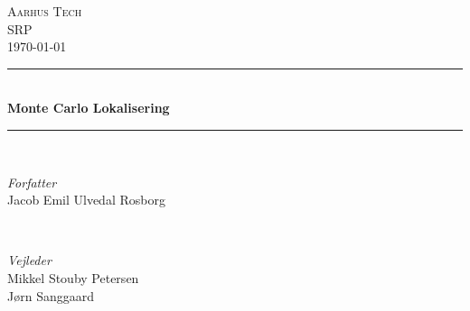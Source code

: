 \documentclass[../SRP.tex]{subfiles}
\begin{document}
\begin{titlepage}
  \newcommand{\HRule}{\rule{\linewidth}{0.5mm}}

	\center

	\textsc{\LARGE Aarhus Tech} \\[0.25cm]
  \textsc{\Large SRP} \\[0.5cm]



  {\large\today}
  \\[1cm]

	\HRule\\[0.4cm]
	{\huge\bfseries Monte Carlo Lokalisering}\\[0.1cm]

	\HRule\\[1.5cm]

	\begin{minipage}{0.4\textwidth}
		\begin{flushleft}
			\large
			\textit{Forfatter}\\
			Jacob Emil Ulvedal Rosborg %
		\end{flushleft}
	\end{minipage}
	~
	\begin{minipage}{0.4\textwidth}
		\begin{flushright}
			\large
			\textit{Vejleder}\\
			Mikkel Stouby Petersen\\
			Jørn Sanggaard
		\end{flushright}
	\end{minipage}\\[4.0cm]

  \begin{center}
  \begin{minipage}{0.8\textwidth}
    \\
    \justify
    \lipsum[1]
  \end{minipage}
  \end{center}
\end{titlepage}
\end{document}
